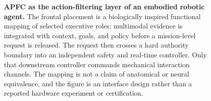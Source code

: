 \begin{figure}[!t]
\centering
\begingroup
\def\RobotPlateAsset{figures/assets/apfc_humanoid_technical_line.png}
\resizebox{\textwidth}{!}{}
\endgroup
\caption{\textbf{APFC as the action-filtering layer of an embodied robotic agent.}
The frontal placement is a biologically inspired functional mapping of selected
executive roles: multimodal evidence is integrated with context, goals, and
policy before a mission-level request is released.  The request then crosses a
hard authority boundary into an independent safety and real-time controller.
Only that downstream controller commands mechanical interaction channels.  The
mapping is not a claim of anatomical or neural equivalence, and the figure is an
interface design rather than a reported hardware experiment or certification.}
\label{fig:robotics-architecture}
\end{figure}
